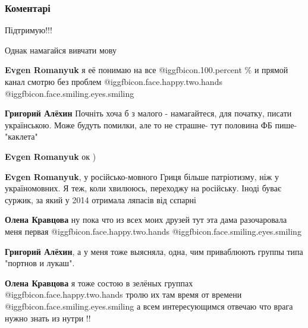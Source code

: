  
 
 
 
 
\subsubsection{Коментарі}
\label{sec:11_11_2021.fb.aljehin_grigorij.1.razdelenie_obschestvo.cmt}

\begin{itemize} %
Підтримую!!!

Однак намагайся вивчати мову

\begin{itemize} %
\textbf{Evgen Romanyuk} я её понимаю на все  @igg{fbicon.100.percent} 
\% и прямой канал смотрю без проблем  @igg{fbicon.face.happy.two.hands}   @igg{fbicon.face.smiling.eyes.smiling} 

\textbf{Григорий Алёхин} Почніть хоча б з малого - намагайтеся, для початку, писати українською. Може будуть помилки, але то не страшне- тут половина ФБ пише-"каклета"

\textbf{Evgen Romanyuk} ок )

\textbf{Evgen Romanyuk}, у російсько-мовного Гриця більше патріотизму, ніж у україномовних.
Я теж, коли хвилююсь, переходжу на російську. Іноді буває суржик, за який у 2014 отримала ляпасів від сєпарні

\textbf{Олена Кравцова} ну пока что из всех моих друзей тут эта дама разочаровала меня первая  @igg{fbicon.face.happy.two.hands}  @igg{fbicon.face.smiling.eyes.smiling} 

\textbf{Григорий Алёхин}, а у меня тоже выясняла, одна, чим приваблюють группы типа "портнов и лукаш".

\textbf{Олена Кравцова} я тоже состою в зелёных группах  @igg{fbicon.face.happy.two.hands}  тролю их там время от времени  @igg{fbicon.face.smiling.eyes.smiling}  а всем интересующимся отвечаю что врага нужно знать из нутри !!
\end{itemize} %


\end{itemize}
